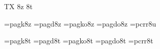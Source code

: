 
\ifx\ffdecl\undefined  \fi

\ffdecl [AvantGarde] {\caps{\rm\bf}} {\rm \bf \it \bi} {} {TX} {8z 8t}

\def\caps{\ffvars{k}{d}{!}{!}\ffsetV{caps}{c}\ffsetX} 
\def\nocaps{\ffsetX} 
\nocaps\relax %
\def\ffwarning#1{\ffmessage{FONT warning: AvantGarde - \string\caps#1 unavailable}}

\ismacro{}\ifttrue
   \font\tenrm=pagk8z   \sizespec
   \font\tenbf=pagd8z   \sizespec
   \font\tenit=pagko8z  \sizespec
   \font\tenbi=pagdo8z  \sizespec
   \font\tentt=pcrr8u   \sizespec
   \let\tensl=\tenit

   \def\ffnamegen{pag\ffvarV\capsV 8z}

   
\fi

\ismacro{}\ifttrue
   \font\tenrm=pagk8t   \sizespec
   \font\tenbf=pagd8t   \sizespec
   \font\tenit=pagko8t  \sizespec
   \font\tenbi=pagdo8t  \sizespec
   \font\tentt=pcrr8t   \sizespec
   \let\tensl=\tenit

   \def\ffnamegen{pag\ffvarV\capsV 8t}
\fi

\tenrm

\let\setsimplemath=\relax %

\def\agTeX{T\kern-.08em\lower.3333ex\hbox{E}\kern-0.09emX}
\ifx\origTeX\undefined \let\origTeX=\TeX \fi
\let\TeX=\agTeX

\ifx\loadmathfonts\relax \endinput \fi
\ifx\mathpreloaded X\else  \fi                     


